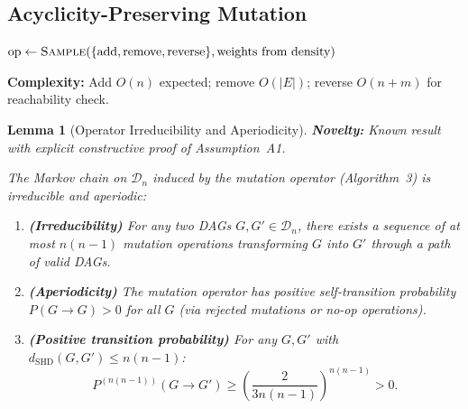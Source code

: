 \documentclass{article}
\theoremstyle{definition}
\theoremstyle{plain}
\newtheorem{lemma}{Lemma}
\theoremstyle{remark}
\DeclareMathOperator{\SHD}{SHD}
\begin{document}
\subsection{Acyclicity-Preserving Mutation}

\begin{algorithm}[htb]
\caption{Acyclicity-Preserving Mutation}
\label{alg:mutation}
$\text{op} \leftarrow \textsc{Sample}(\{\text{add}, \text{remove}, \text{reverse}\},
  \text{weights from density})$\;
\;
\end{algorithm}

\textbf{Complexity:} Add $O(n)$ expected; remove $O(|E|)$; reverse $O(n + m)$
for reachability check.

\begin{lemma}[Operator Irreducibility and Aperiodicity]
\label{lem:operator_ergodicity}
\textbf{Novelty:} Known result with explicit constructive proof of Assumption~A1.

The Markov chain on $\mathcal{D}_n$ induced by the mutation operator (Algorithm~3)
is irreducible and aperiodic:

\begin{enumerate}
  \item[(a)] \textbf{(Irreducibility)} For any two DAGs $G, G' \in \mathcal{D}_n$,
    there exists a sequence of at most $n(n-1)$ mutation operations transforming
    $G$ into $G'$ through a path of valid DAGs.
  \item[(b)] \textbf{(Aperiodicity)} The mutation operator has positive self-transition
    probability $P(G \to G) > 0$ for all $G$ (via rejected mutations or no-op operations).
  \item[(c)] \textbf{(Positive transition probability)} For any $G, G'$ with
    $d_{\SHD}(G, G') \leq n(n-1)$:
    \begin{equation}
      P^{(n(n-1))}(G \to G') \geq \left(\frac{2}{3n(n-1)}\right)^{n(n-1)} > 0.
    \end{equation}
\end{enumerate}
\end{lemma}
\end{document}
